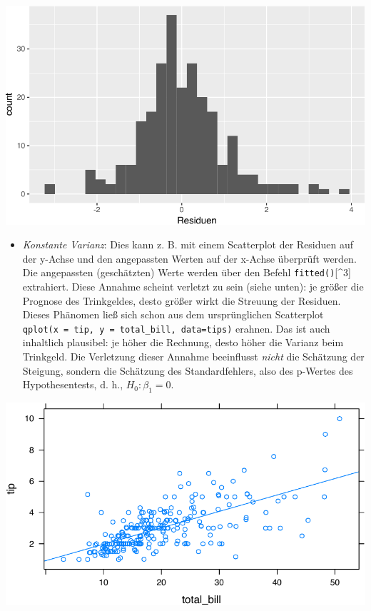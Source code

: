 \documentclass[12pt,ngerman,]{book}
\newenvironment{Shaded}{\begin{snugshade}}{\end{snugshade}}
\newcommand{\KeywordTok}[1]{\textcolor[rgb]{0.13,0.29,0.53}{\textbf{{#1}}}}
\newcommand{\DataTypeTok}[1]{\textcolor[rgb]{0.13,0.29,0.53}{{#1}}}
\newcommand{\FloatTok}[1]{\textcolor[rgb]{0.00,0.00,0.81}{{#1}}}
\newcommand{\StringTok}[1]{\textcolor[rgb]{0.31,0.60,0.02}{{#1}}}
\newcommand{\NormalTok}[1]{{#1}}
\providecommand{\tightlist}{%
  \setlength{\itemsep}{0pt}\setlength{\parskip}{0pt}}
\renewenvironment{Shaded}{\begin{kframe}}{\end{kframe}}
\begin{document}
\begin{center}\includegraphics[width=0.7\linewidth]{071_Regression_files/figure-latex/unnamed-chunk-7-1} \end{center}

\begin{itemize}
\tightlist
\item
  \emph{Konstante Varianz}: Dies kann z. B. mit einem Scatterplot der
  Residuen auf der y-Achse und den angepassten Werten auf der x-Achse
  überprüft werden. Die angepassten (geschätzten) Werte werden über den
  Befehl \texttt{fitted()}{[}\^{}3{]} extrahiert. Diese Annahme scheint
  verletzt zu sein (siehe unten): je größer die Prognose des
  Trinkgeldes, desto größer wirkt die Streuung der Residuen. Dieses
  Phänomen ließ sich schon aus dem ursprünglichen Scatterplot
  \texttt{qplot(x\ =\ tip,\ y\ =\ total\_bill,\ data=tips)} erahnen. Das
  ist auch inhaltlich plausibel: je höher die Rechnung, desto höher die
  Varianz beim Trinkgeld. Die Verletzung dieser Annahme beeinflusst
  \emph{nicht} die Schätzung der Steigung, sondern die Schätzung des
  Standardfehlers, also des p-Wertes des Hypothesentests, d. h.,
  \(H_0:\beta_1=0\).
\end{itemize}

\begin{Shaded}
\end{Shaded}

\begin{center}\includegraphics[width=0.7\linewidth]{071_Regression_files/figure-latex/unnamed-chunk-8-1} \end{center}
\end{document}
